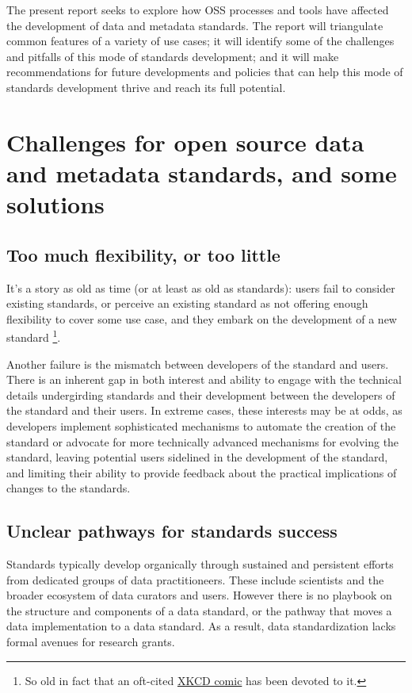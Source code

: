 \documentclass[
  letterpaper,
  DIV=11,
  numbers=noendperiod]{scrartcl}
\begin{document}
The present report seeks to explore how OSS processes and tools have
affected the development of data and metadata standards. The report will
triangulate common features of a variety of use cases; it will identify
some of the challenges and pitfalls of this mode of standards
development; and it will make recommendations for future developments
and policies that can help this mode of standards development thrive and
reach its full potential.

\section{Challenges for open source data and metadata standards, and
some
solutions}\label{challenges-for-open-source-data-and-metadata-standards-and-some-solutions}

\subsection{Too much flexibility, or too
little}\label{too-much-flexibility-or-too-little}

It's a story as old as time (or at least as old as standards): users
fail to consider existing standards, or perceive an existing standard as
not offering enough flexibility to cover some use case, and they embark
on the development of a new standard \footnote{So old in fact that an
  oft-cited \href{https://xkcd.com/927/}{XKCD comic} has been devoted to
  it.}.

Another failure is the mismatch between developers of the standard and
users. There is an inherent gap in both interest and ability to engage
with the technical details undergirding standards and their development
between the developers of the standard and their users. In extreme
cases, these interests may be at odds, as developers implement
sophisticated mechanisms to automate the creation of the standard or
advocate for more technically advanced mechanisms for evolving the
standard, leaving potential users sidelined in the development of the
standard, and limiting their ability to provide feedback about the
practical implications of changes to the standards.

\subsection{Unclear pathways for standards
success}\label{unclear-pathways-for-standards-success}

Standards typically develop organically through sustained and persistent
efforts from dedicated groups of data practitioneers. These include
scientists and the broader ecosystem of data curators and users. However
there is no playbook on the structure and components of a data standard,
or the pathway that moves a data implementation to a data standard. As a
result, data standardization lacks formal avenues for research grants.
\end{document}
